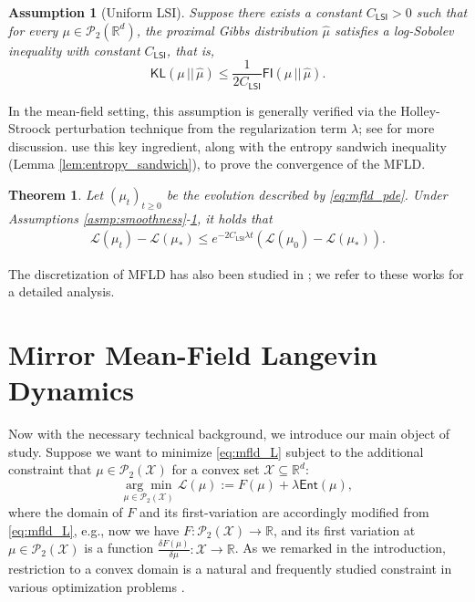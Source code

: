 \documentclass{article}
\newtheorem{theorem}{Theorem}[section]
\newtheorem{assumption}{Assumption}
\newcommand{\CLSI}[0]{C_{\mathsf{LSI}}}
\newcommand{\sep}[0]{\,||\,}
\newcommand{\KL}[0]{\mathsf{KL}}
\newcommand{\FI}[0]{\mathsf{FI}}
\begin{document}
\begin{assumption}[Uniform LSI]\label{asmp:ULSI}
    Suppose there exists a constant $\CLSI > 0$ such that  for every $\mu\in\mathcal{P}_2(\mathbb{R}^d)$, the proximal Gibbs distribution $\hat{\mu}$ satisfies a log-Sobolev inequality with constant $\CLSI$, that is, \[\KL(\mu\sep\hat{\mu})\le \frac{1}{2\CLSI}\FI(\mu\sep\hat{\mu}).\]
\end{assumption}
In the mean-field setting, this assumption is generally verified via the Holley-Stroock perturbation technique \citep{holleystroock} from the regularization term $\lambda$; see \citet{suzuki2023meanfield} for more discussion. \citet{nitanda2022convex,chizat2022meanfield} use this key ingredient, along with the entropy sandwich inequality (Lemma \ref{lem:entropy_sandwich}), to prove the convergence of the MFLD.
\begin{theorem}
    Let $(\mu_t)_{t\ge0}$ be the evolution described by \eqref{eq:mfld_pde}. Under Assumptions \ref{asmp:smoothness}-\ref{asmp:ULSI}, it holds that
    \begin{align*}
    \mathcal{L}(\mu_t) - \mathcal{L}(\mu_*) \le e^{-2\CLSI \lambda t}(\mathcal{L}(\mu_0) - \mathcal{L}(\mu_*)).
    \end{align*}
\end{theorem}
The discretization of MFLD has also been studied in \citet{nitanda2022convex,suzuki2023meanfield,nitanda2024improved}; we refer to these works for a detailed analysis.

\section{Mirror Mean-Field Langevin Dynamics}\label{sec:mirror_mfld}
Now with the necessary technical background, we introduce our main object of study. Suppose we want to minimize \eqref{eq:mfld_L} subject to the additional constraint that $\mu\in\mathcal{P}_2(\mathcal{X})$ for a convex set $\mathcal{X}\subseteq \mathbb{R}^d$:
\begin{equation}\label{eq:mmfld_L}
    \underset{\mu\in\mathcal{P}_2(\mathcal{X})}{\arg\min}\,\mathcal{L}(\mu) := F(\mu) + \lambda {\mathsf{Ent}(\mu)},
\end{equation}
where the domain of $F$ and its first-variation are accordingly modified from \eqref{eq:mfld_L}, e.g., now we have $F:\mathcal{P}_2(\mathcal{X})\to\mathbb{R}$, and its first variation at $\mu\in\mathcal{P}_2(\mathcal{X})$ is a function $\frac{\delta F(\mu)}{\delta\mu}:\mathcal{X}\to\mathbb{R}$. As we remarked in the introduction, restriction to a convex domain is a natural and frequently studied constraint in various optimization problems \citep{chizat2022trajectoryinferencemeanfieldlangevin,chizat2023doublyregularizedentropicwasserstein,vaskevicius2023barycenter,gu2025partially}.
\end{document}
